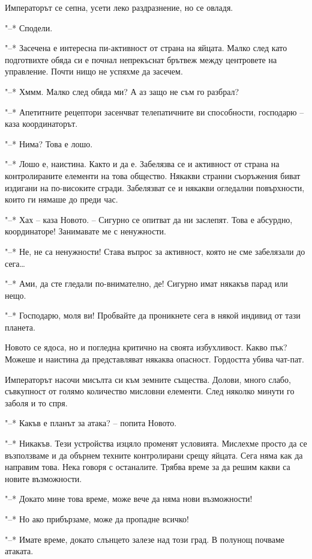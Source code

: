 \documentclass[ebook,openany,12pt]{memoir}
\begin{document}
Императорът се сепна, усети леко раздразнение, но се овладя.

"--* Сподели.

"--* Засечена е интересна пи-активност от страна на яйцата. Малко след като подготвихте обяда си е почнал непрекъснат брътвеж между центровете на управление. Почти нищо не успяхме да засечем.

"--* Хммм. Малко след обяда ми? А аз защо не съм го разбрал?

"--* Апетитните рецептори засенчват телепатичните ви способности, господарю – каза координаторът.

"--* Нима? Това е лошо.

"--* Лошо е, наистина. Както и да е. Забелязва се и активност от страна на контролираните елементи на това общество. Някакви странни съоръжения биват издигани на по-високите сгради. Забелязват се и някакви огледални повърхности, които ги нямаше до преди час.

"--* Хах -- каза Новото. -- Сигурно се опитват да ни заслепят. Това е абсурдно, координаторе! Занимавате ме с ненужности.

"--* Не, не са ненужности! Става въпрос за активност, която не сме забелязали до сега\ldots

"--* Ами, да сте гледали по-внимателно, де! Сигурно имат някакъв парад или нещо.

"--* Господарю, моля ви! Пробвайте да проникнете сега в някой индивид от тази планета.

Новото се ядоса, но и погледна критично на своята избухливост. Какво пък? Можеше и наистина да представляват някаква опасност. Гордостта убива чат-пат.

Императорът насочи мисълта си към земните същества. Долови, много слабо, съвкупност от голямо количество мисловни елементи. След няколко минути го заболя и то спря.

"--* Какъв е планът за атака? – попита Новото.

"--* Никакъв. Тези устройства изцяло променят условията. Мислехме просто да се възползваме и да обърнем техните контролирани срещу яйцата. Сега няма как да направим това. Нека говоря с останалите. Трябва време за да решим какви са новите възможности.

"--* Докато мине това време, може вече да няма нови възможности!

"--* Но ако прибързаме, може да пропадне всичко!

"--* Имате време, докато слънцето залезе над този град. В полунощ почваме атаката.
\end{document}
